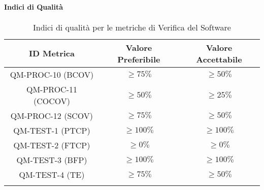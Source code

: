 		\paragraph{Indici di Qualità}

			\begin{center}
				\begin{longtable}{|c|c|c|}
				\hline
				\rowcolor{lighter-grayer}
				\textbf{ID Metrica} & \textbf{Valore Preferibile} & \textbf{Valore Accettabile}\\
				\hline
				\endfirsthead
				\hline
				QM-PROC-10 (BCOV) & \(\geq 75\%\) & \(\geq 50\%\) \\ \hline
				QM-PROC-11 (COCOV) & \(\geq 50\%\) & \(\geq 25\%\) \\ \hline
				QM-PROC-12 (SCOV) & \(\geq 75\%\) & \(\geq 50\%\) \\ \hline
				QM-TEST-1 (PTCP) & \(\geq 100\%\) & \(\geq 100\%\) \\ \hline
				QM-TEST-2 (FTCP) & \(\geq 0\%\) & \(\geq 0\%\) \\ \hline
				QM-TEST-3 (BFP) & \(\geq 100\%\) & \(\geq 100\%\) \\ \hline
				QM-TEST-4 (TE) & \(\geq 75\%\) & \(\geq 50\%\) \\ \hline
				\hline
				\caption{Indici di qualità per le metriche di Verifica del Software}
				\end{longtable}
			\end{center}
